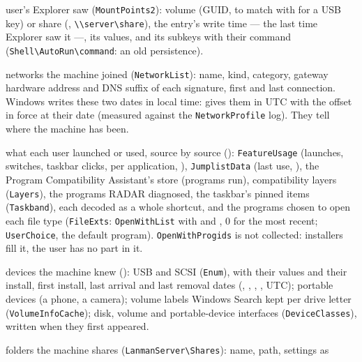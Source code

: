 \documentclass[11pt,a4paper,oneside]{report}
\begin{document}
\begin{description}[style=nextline,leftmargin=1.2em]
        user's Explorer saw (\texttt{MountPoints2}): volume (GUID, to match with
         for a USB key) or share (,
        \texttt{\textbackslash\textbackslash server\textbackslash share}), the
        entry's write time --- the last time Explorer saw it ---, its values,
        and its subkeys with their command
        (\texttt{Shell\textbackslash AutoRun\textbackslash command}: an old
        persistence).
  \item[\fichier{known\_networks.json}] networks the machine joined
        (\texttt{NetworkList}): name, kind, category, gateway hardware address
        and DNS suffix of each signature, first and last connection. Windows
        writes these two dates in local time: \wac{} gives them in UTC with the
        offset in force at their date (measured against the
        \texttt{NetworkProfile} log). They tell where the machine has been.
  \item[\fichier{program\_usage.json}] what each user launched or used,
        source by source (): \texttt{FeatureUsage} (launches,
        switches, taskbar clicks, per application, ),
        \texttt{JumplistData} (last use, ), the Program
        Compatibility Assistant's store (programs run), compatibility layers
        (\texttt{Layers}), the programs RADAR diagnosed, the taskbar's pinned
        items (\texttt{Taskband}), each decoded as a whole shortcut, and the
        programs chosen to open each file type (\texttt{FileExts}:
        \texttt{OpenWithList} with  and ,
        0 for the most recent; \texttt{UserChoice}, the default program).
        \texttt{OpenWithProgids} is not collected: installers fill it, the user
        has no part in it.
  \item[\fichier{devices.json}] devices the machine knew ():
        USB and SCSI (\texttt{Enum}), with their values and their install, first
        install, last arrival and last removal dates (,
        , , , UTC);
        portable devices (a phone, a camera); volume labels Windows Search kept
        per drive letter (\texttt{VolumeInfoCache}); disk, volume and
        portable-device interfaces (\texttt{DeviceClasses}), written when they
        first appeared.
  \item[\fichier{network\_shares.json}] folders the machine shares
        (\texttt{LanmanServer\textbackslash Shares}): name, path, settings as

\end{description}
\end{document}
